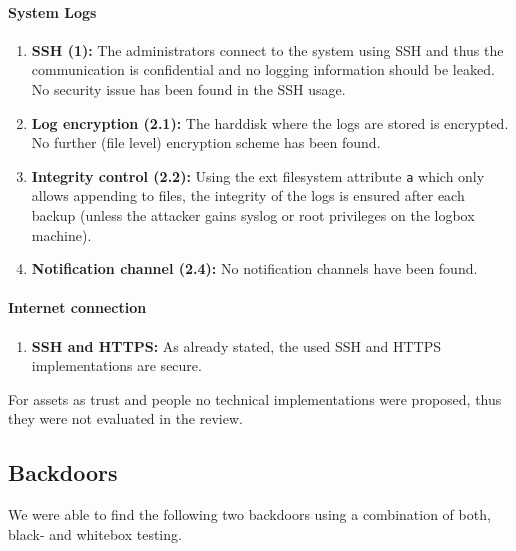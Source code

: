 \documentclass[english]{article}
\begin{document}
\paragraph{System Logs} 
\begin{enumerate}[label=(\alph*)]
	\item \textbf{SSH (1):} The administrators connect to the system using SSH and thus the communication is confidential and no logging information should be leaked. No security issue has been found in the SSH usage.
	\item \textbf{Log encryption (2.1):} The harddisk where the logs are stored is encrypted. No further (file level) encryption scheme has been found.
	\item \textbf{Integrity control (2.2):} Using the ext filesystem attribute \texttt{a} which only allows appending to files, the integrity of the logs is ensured after each backup (unless the attacker gains syslog or root privileges on the logbox machine).
	\item \textbf{Notification channel (2.4):} No notification channels have been found.
\end{enumerate}

\paragraph{Internet connection} 
\begin{enumerate}[label=(\alph*)]
	\item \textbf{SSH and HTTPS:} As already stated, the used SSH and HTTPS implementations are secure.
\end{enumerate}

For assets as trust and people no technical implementations were proposed, thus they were not evaluated in the review.


\subsection{Backdoors}

We were able to find the following two backdoors using a combination of both, black- and whitebox testing.
\end{document}
